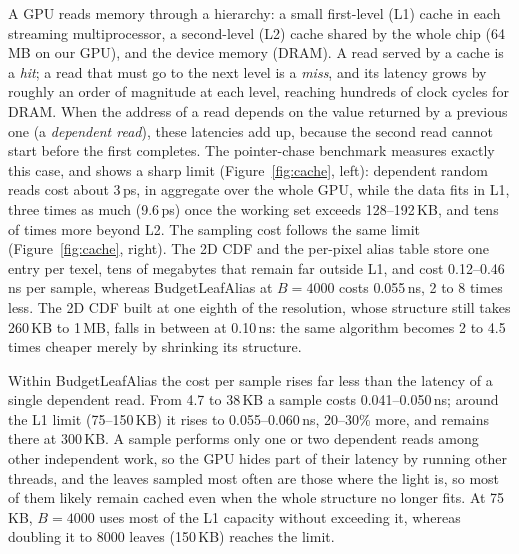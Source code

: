 \documentclass[10pt]{article}
\begin{document}
A GPU reads memory through a hierarchy: a small first-level (L1) cache in each streaming multiprocessor, a second-level (L2) cache shared by the whole chip (64\,MB on our GPU), and the device memory (DRAM). A read served by a cache is a \emph{hit}; a read that must go to the next level is a \emph{miss}, and its latency grows by roughly an order of magnitude at each level, reaching hundreds of clock cycles for DRAM. When the address of a read depends on the value returned by a previous one (a \emph{dependent read}), these latencies add up, because the second read cannot start before the first completes. The pointer-chase benchmark measures exactly this case, and shows a sharp limit (Figure~\ref{fig:cache}, left): dependent random reads cost about 3\,ps, in aggregate over the whole GPU, while the data fits in L1, three times as much (9.6\,ps) once the working set exceeds 128--192\,KB, and tens of times more beyond L2. The sampling cost follows the same limit (Figure~\ref{fig:cache}, right). The 2D CDF and the per-pixel alias table store one entry per texel, tens of megabytes that remain far outside L1, and cost 0.12--0.46\,ns per sample, whereas BudgetLeafAlias at $B=4000$ costs 0.055\,ns, 2 to 8 times less. The 2D CDF built at one eighth of the resolution, whose structure still takes 260\,KB to 1\,MB, falls in between at 0.10\,ns: the same algorithm becomes 2 to 4.5 times cheaper merely by shrinking its structure.

Within BudgetLeafAlias the cost per sample rises far less than the latency of a single dependent read. From 4.7 to 38\,KB a sample costs 0.041--0.050\,ns; around the L1 limit (75--150\,KB) it rises to 0.055--0.060\,ns, 20--30\% more, and remains there at 300\,KB. A sample performs only one or two dependent reads among other independent work, so the GPU hides part of their latency by running other threads, and the leaves sampled most often are those where the light is, so most of them likely remain cached even when the whole structure no longer fits. At 75\,KB, $B=4000$ uses most of the L1 capacity without exceeding it, whereas doubling it to 8000 leaves (150\,KB) reaches the limit.
\end{document}
